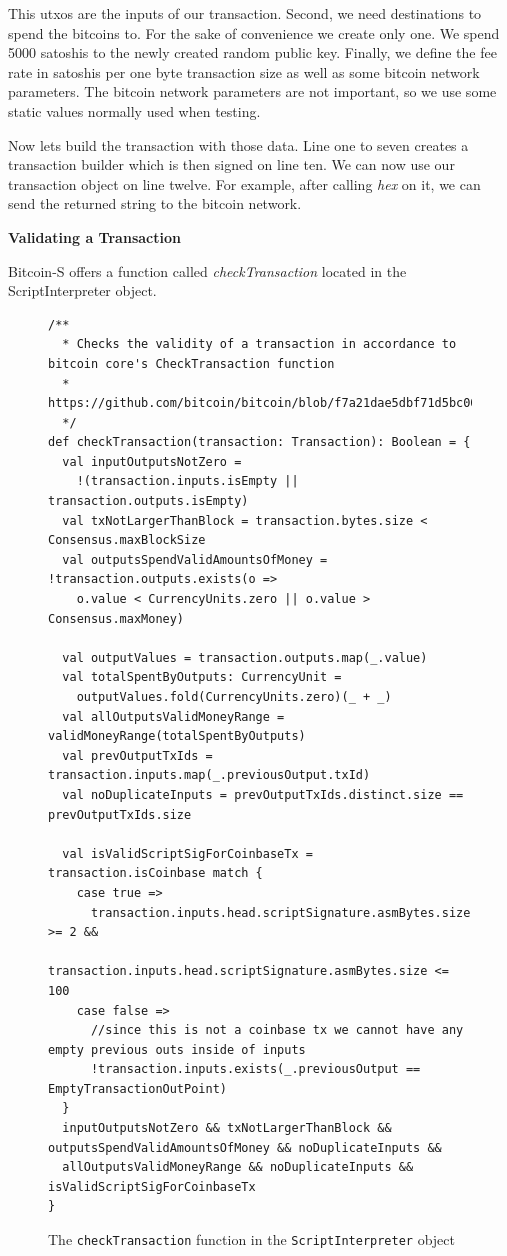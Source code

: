 \documentclass[runningheads]{llncs}
\renewcommand{\paragraph}{\textbf}%
\begin{document}
This utxos are the inputs of our transaction.
Second, we need destinations to spend the bitcoins to.
For the sake of convenience we create only one.
We spend 5000 satoshis to the newly created random public key.
Finally, we define the fee rate in satoshis per one byte transaction
size as well as some bitcoin network parameters.  The bitcoin network
parameters are not important, so we use some static values normally
used when testing.

Now lets build the transaction with those data.
Line one to seven creates a transaction builder which is then signed
on line ten.  We can now use our transaction object on line twelve.
For example, after calling \emph{hex} on it, we can send the returned
string to the bitcoin network.


\paragraph{Validating a Transaction}

Bitcoin-S offers a function called \emph{checkTransaction} located in the ScriptInterpreter object.

\begin{figure}
\begin{lstlisting}[style=scala]
/**
  * Checks the validity of a transaction in accordance to bitcoin core's CheckTransaction function
  * https://github.com/bitcoin/bitcoin/blob/f7a21dae5dbf71d5bc00485215e84e6f2b309d0a/src/main.cpp#L939.
  */
def checkTransaction(transaction: Transaction): Boolean = {
  val inputOutputsNotZero =
    !(transaction.inputs.isEmpty || transaction.outputs.isEmpty)
  val txNotLargerThanBlock = transaction.bytes.size < Consensus.maxBlockSize
  val outputsSpendValidAmountsOfMoney = !transaction.outputs.exists(o =>
    o.value < CurrencyUnits.zero || o.value > Consensus.maxMoney)

  val outputValues = transaction.outputs.map(_.value)
  val totalSpentByOutputs: CurrencyUnit =
    outputValues.fold(CurrencyUnits.zero)(_ + _)
  val allOutputsValidMoneyRange = validMoneyRange(totalSpentByOutputs)
  val prevOutputTxIds = transaction.inputs.map(_.previousOutput.txId)
  val noDuplicateInputs = prevOutputTxIds.distinct.size == prevOutputTxIds.size

  val isValidScriptSigForCoinbaseTx = transaction.isCoinbase match {
    case true =>
      transaction.inputs.head.scriptSignature.asmBytes.size >= 2 &&
        transaction.inputs.head.scriptSignature.asmBytes.size <= 100
    case false =>
      //since this is not a coinbase tx we cannot have any empty previous outs inside of inputs
      !transaction.inputs.exists(_.previousOutput == EmptyTransactionOutPoint)
  }
  inputOutputsNotZero && txNotLargerThanBlock && outputsSpendValidAmountsOfMoney && noDuplicateInputs &&
  allOutputsValidMoneyRange && noDuplicateInputs && isValidScriptSigForCoinbaseTx
}
\end{lstlisting}
  
  \caption{The \texttt{checkTransaction} function in the \texttt{ScriptInterpreter} object}
  \label{fig:checktrans}
\end{figure}
\end{document}
